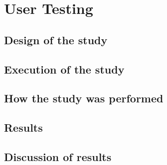 
\section{User Testing}

\subsection{Design of the study}
\subsection{Execution of the study}
\subsection{How the study was performed}
\subsection{Results}
\subsection{Discussion of results}
